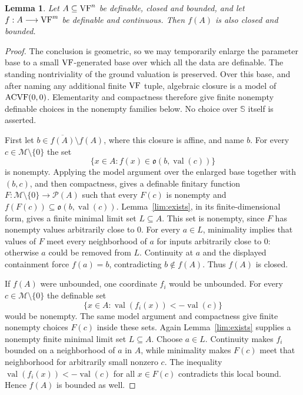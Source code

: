 \documentclass[12pt]{amsart}
\theoremstyle{plain}
\newtheorem{lem}[thm]{Lemma}
\theoremstyle{definition}
\theoremstyle{remark}
\numberwithin{equation}{section}
\theoremstyle{plain}
\newcommand{\VF}{\textup{VF}}
\newcommand{\ACVF}{\textup{ACVF}}
\newcommand{\MM}{\mdl M}
\newcommand{\go}{\mathfrak{o}}
\newcommand{\0}{\emptyset}
\newcommand{\mdl}[1]{\mathcal{#1}}  %
\newcommand{\fun}{\longrightarrow}
\DeclareMathOperator{\vv}{val}
\begin{document}
\begin{lem}\label{cb:to:cb}
Let $A\subseteq\VF^n$ be definable, closed and bounded, and let $f:A\fun\VF^m$ be definable and continuous. Then $f(A)$ is also closed and bounded.
\end{lem}
\begin{proof}
The conclusion is geometric, so we may temporarily enlarge the parameter base to a small $\VF$-generated base over which all the data are definable. The standing nontriviality of the ground valuation is preserved. Over this base, and after naming any additional finite $\VF$ tuple, algebraic closure is a model of $\ACVF(0,0)$. Elementarity and compactness therefore give finite nonempty definable choices in the nonempty families below. No choice over $\mathbb S$ itself is asserted.

First let $b\in\overline{f(A)}\setminus f(A)$, where this closure is affine, and name $b$. For every $c\in\MM\setminus\{0\}$ the set
\[
\{x\in A:f(x)\in\go(b,\vv(c))\}
\]
is nonempty. Applying the model argument over the enlarged base together with $(b,c)$, and then compactness, gives a definable finitary function $F:\MM\setminus\{0\}\fun\mdl P(A)$ such that every $F(c)$ is nonempty and $f(F(c))\subseteq\go(b,\vv(c))$. Lemma~\ref{lim:exists}, in its finite-dimensional form, gives a finite minimal limit set $L\subseteq A$. This set is nonempty, since $F$ has nonempty values arbitrarily close to $0$. For every $a\in L$, minimality implies that values of $F$ meet every neighborhood of $a$ for inputs arbitrarily close to $0$: otherwise $a$ could be removed from $L$. Continuity at $a$ and the displayed containment force $f(a)=b$, contradicting $b\notin f(A)$. Thus $f(A)$ is closed.

If $f(A)$ were unbounded, one coordinate $f_i$ would be unbounded. For every $c\in\MM\setminus\{0\}$ the definable set
\[
\{x\in A:\vv(f_i(x))<-\vv(c)\}
\]
would be nonempty. The same model argument and compactness give finite nonempty choices $F(c)$ inside these sets. Again Lemma~\ref{lim:exists} supplies a nonempty finite minimal limit set $L\subseteq A$. Choose $a\in L$. Continuity makes $f_i$ bounded on a neighborhood of $a$ in $A$, while minimality makes $F(c)$ meet that neighborhood for arbitrarily small nonzero $c$. The inequality $\vv(f_i(x))<-\vv(c)$ for all $x\in F(c)$ contradicts this local bound. Hence $f(A)$ is bounded as well.
\end{proof}
\end{document}
